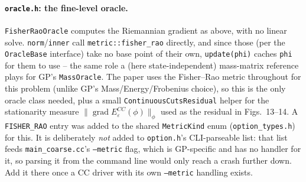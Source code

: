 \documentclass[11pt]{article}
\begin{document}
\paragraph{\texttt{oracle.h}: the fine-level oracle.} \texttt{FisherRaoOracle} computes the
Riemannian gradient as above, with no linear solve. \texttt{norm}/\texttt{inner} call
\texttt{metric::fisher\_rao} directly, and since those (per the \texttt{OracleBase}
interface) take no base point of their own, \texttt{update(phi)} caches \texttt{phi} for
them to use -- the same role a (here state-independent) mass-matrix reference plays for
GP's \texttt{MassOracle}. The paper uses the Fisher--Rao metric throughout for this problem
(unlike GP's Mass/Energy/Frobenius choice), so this is the only oracle class needed, plus a
small \texttt{ContinuousCutsResidual} helper for the stationarity measure
$\|\operatorname{grad}E_\varepsilon^{CC}(\phi)\|_\phi$ used as the residual in Figs.~13--14.
A \texttt{FISHER\_RAO} entry was added to the shared \texttt{MetricKind} enum
(\texttt{option\_types.h}) for this. It is deliberately \emph{not} added to
\texttt{option.h}'s CLI-parseable list: that list feeds \texttt{main\_coarse.cc}'s
\texttt{--metric} flag, which is GP-specific and has no handler for it, so parsing it from
the command line would only reach a crash further down. Add it there once a CC driver with
its own \texttt{--metric} handling exists.
\end{document}
